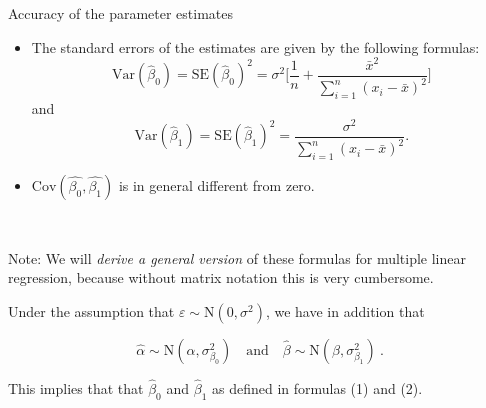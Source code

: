 \documentclass[10pt,ignorenonframetext,]{beamer}
\begin{document}
\begin{frame}

\begin{block}{Accuracy of the parameter estimates}

\vspace{2mm}

\begin{itemize}
\item
  The standard errors of the estimates are given by the following
  formulas:
  \[\text{Var}(\hat{\beta}_0)=\text{SE}(\hat{\beta}_0)^2 = \sigma^2 \Big [ \frac{1}{n} + \frac{\bar{x}^2}{\sum_{i=1}^n (x_i -\bar{x})^2} \Big]\]
  and
  \[\text{Var}(\hat{\beta}_1)=\text{SE}(\hat{\beta}_1)^2 = \frac{\sigma^2}{\sum_{i=1}^n (x_i-\bar{x})^2}.\]
\item
  \(\text{Cov}(\hat{\beta_0},\hat{\beta_1})\) is in general different
  from zero.
\end{itemize}

\(~\)

\tiny
Note: We will \emph{derive a general version} of these formulas for
multiple linear regression, because without matrix notation this is very
cumbersome.

\end{block}

\end{frame}

\begin{frame}

Under the assumption that \(\varepsilon \sim \text{N}(0,\sigma^2)\), we
have in addition that

\[
 \hat\alpha \sim \text{N}(\alpha,{\sigma^{2}_{\beta_0}}) \quad \text{and} \quad \hat\beta \sim \text{N}(\beta,{\sigma^{2}_{\beta_1}}) \ .
\]

This implies that that \(\hat\beta_0\) and \(\hat\beta_1\) as defined in
formulas (1) and (2).

\end{frame}
\end{document}
